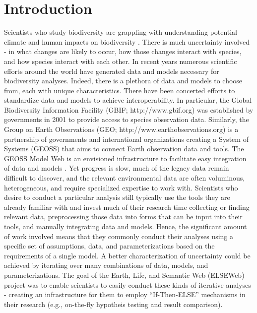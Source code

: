 \documentclass[letterpaper]{article}
\begin{document}
\section{Introduction}
Scientists who study biodiversity are grappling with understanding potential climate and human impacts on biodiversity \cite{barnosky2011has}. There is much uncertainty involved - in what changes are likely to occur, how those changes interact with species, and how species interact with each other. In recent years numerous scientific efforts around the world have generated data and models necessary for biodiversity analyses. Indeed, there is a plethora of data and models to choose from, each with unique characteristics. There have been concerted efforts to standardize data and models to achieve interoperability. In particular, the Global Biodiversity Information Facility (GBIF; http://www.gbif.org) was established by governments in 2001 to provide access to species observation data. Similarly, the Group on Earth Observations (GEO; http://www.earthobservations.org) is a partnership of governments and international organizations creating a System of Systems (GEOSS) that aims to connect Earth observation data and tools. The GEOSS Model Web is an envisioned infrastructure to facilitate easy integration of data and models \cite{geller2008looking,nativi2012environmental}. Yet progress is slow, much of the legacy data remain difficult to discover, and the relevant environmental data are often voluminous, heterogeneous, and require specialized expertise to work with. Scientists who desire to conduct a particular analysis still typically use the tools they are already familiar with and invest much of their research time collecting or finding relevant data, preprocessing those data into forms that can be input into their tools, and manually integrating data and models. Hence, the significant amount of work involved means that they commonly conduct their analyses using a specific set of assumptions, data, and parameterizations based on the requirements of a single model. A better characterization of uncertainty could be achieved by iterating over many combinations of data, models, and parameterizations. The goal of the Earth, Life, and Semantic Web (ELSEWeb) project was to enable scientists to easily conduct these kinds of iterative analyses - creating an infrastructure for them to employ ``If-Then-ELSE'' mechanisms in their research (e.g., on-the-fly hypotheis testing and result comparison).
\end{document}
